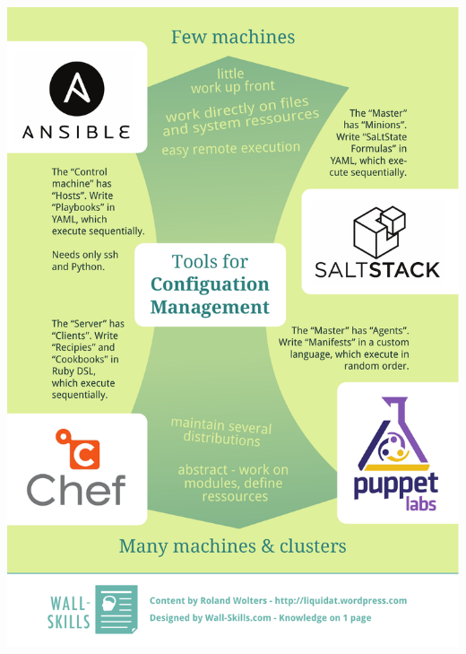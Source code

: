 \documentclass[pdf, 8pt, unicode, t]{beamer} %
\begin{document}
\begin{frame}
\begin{center}
{\includegraphics[height=1.0\textheight]{./images/compare.pdf}}
\end{center}
\end{frame}
\end{document}
